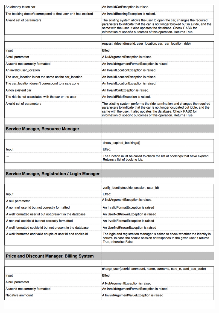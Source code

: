 \documentclass[a4paper,10pt]{article}
\begin{document}
    \begin{figure}[!h]
  \centering
    \includegraphics[scale=0.26]{Resources/4.png}
  \end{figure}
\end{document}
